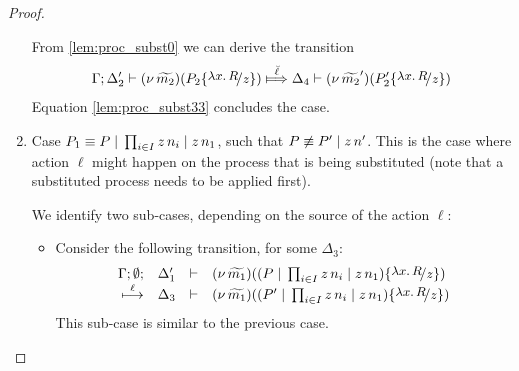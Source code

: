 \begin{proof}
\begin{enumerate}
				From \eqref{lem:proc_subst0} we can derive the transition
				\begin{eqnarray*}
					\horel{\Gamma}{\Delta_2'}{\newsp{\widetilde{m_2}}{P_2 \subst{{\abs{x}{R}}}{z} }}
					{\Hby{\mact{\ell}}}
					{\Delta_4}{\newsp{\widetilde{m_2}'}{P_2' \subst{{\abs{x}{R}}}{z} }}
				\end{eqnarray*}
				Equation \eqref{lem:proc_subst33} concludes the case.


		\item	Case $P_1 \equiv P \;|\; \prod_{i \in I} z\, {n_i} \;|\; z\, {n_1}$, such that
				$P \not\equiv P' \;|\; z\, {n'}$. This is the case where action $\ell$ might
				happen on the process that is being substituted (note that a substituted process
				needs to be applied first).

				We identify two sub-cases, depending on the source of the action $\ell$:
				\begin{itemize}
					\item	Consider the following transition, for some $\Delta_3$:
							\begin{eqnarray*}
								\mhorel{\Gamma}{\Delta_1'}{\newsp{\widetilde{m_1}}{(P \Par \prod_{i \in I} \appl{z}{n_i} \Par \appl{z}{n_1}) \subst{{\abs{x}{R}}}{z} }}
								{\hby{\ell}}
								{\Delta_3}{}{\newsp{\widetilde{m_1}}{(P' \Par \prod_{i \in I} \appl{z}{n_i} \Par \appl{z}{n_1}) \subst{{\abs{x}{R}}}{z} }}
							\end{eqnarray*}
							This sub-case is similar to the previous case.


\end{itemize}
\end{enumerate}
\end{proof}
